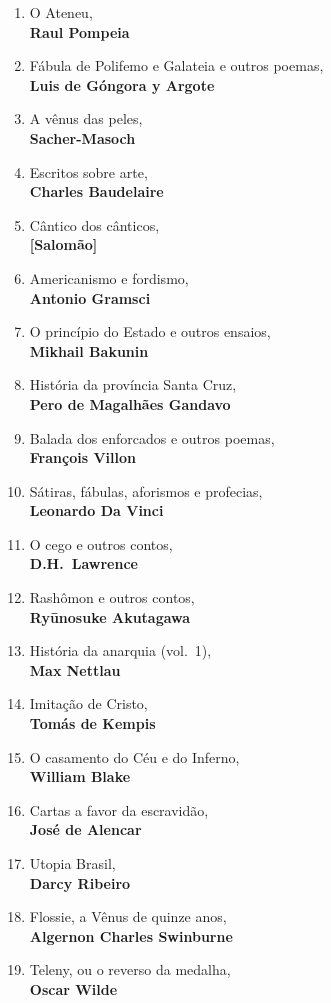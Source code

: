 \begin{enumerate} [font=\Formular\footnotesize]
\item O Ateneu,\\ \textbf{Raul Pompeia}
\item Fábula de Polifemo e Galateia e outros poemas,\\ \textbf{Luis de Góngora y Argote}
\item A vênus das peles,\\ \textbf{Sacher-Masoch}
\item Escritos sobre arte,\\ \textbf{Charles Baudelaire}
\item Cântico dos cânticos,\\ \textbf{{[}Salomão{]}}
\item Americanismo e fordismo,\\ \textbf{Antonio Gramsci}
\item O princípio do Estado e outros ensaios,\\ \textbf{Mikhail Bakunin}
\item História da província Santa Cruz,\\ \textbf{Pero de Magalhães Gandavo}
\item Balada dos enforcados e outros poemas,\\ \textbf{François Villon}
\item Sátiras, fábulas, aforismos e profecias,\\ \textbf{Leonardo Da Vinci}
\item O cego e outros contos,\\ \textbf{D.H.~Lawrence}
\item Rashômon e outros contos,\\ \textbf{Ryūnosuke Akutagawa}
\item História da anarquia (vol.~1),\\ \textbf{Max Nettlau}
\item Imitação de Cristo,\\ \textbf{Tomás de Kempis}
\item O casamento do Céu e do Inferno,\\ \textbf{William Blake}
\item Cartas a favor da escravidão,\\ \textbf{José de Alencar}
\item Utopia Brasil,\\ \textbf{Darcy Ribeiro}
\item Flossie, a Vênus de quinze anos,\\ \textbf{Algernon Charles Swinburne}
\item Teleny, ou o reverso da medalha,\\ \textbf{Oscar Wilde}

\end{enumerate}
